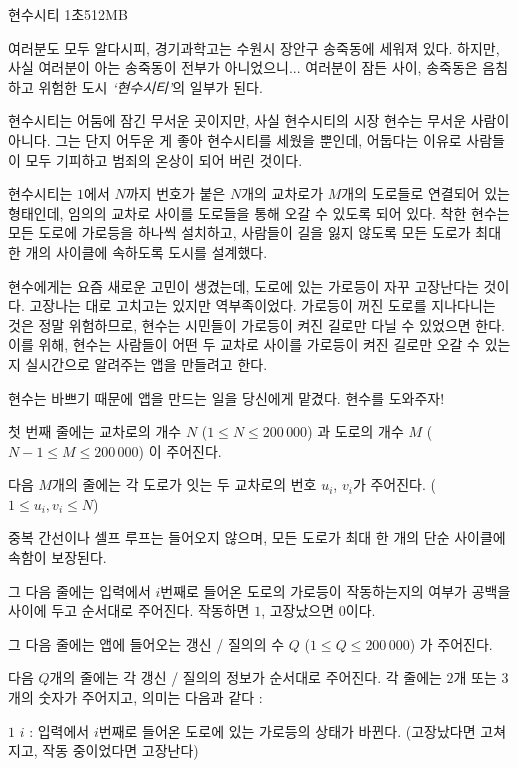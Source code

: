 \begin{problem}{현수시티}
{}{}
{1초}{512MB}{}

여러분도 모두 알다시피, 경기과학고는 수원시 장안구 송죽동에 세워져 있다. 하지만, 사실 여러분이 아는 송죽동이 전부가 아니었으니... 여러분이 잠든 사이, 송죽동은 음침하고 위험한 도시 \textit{`현수시티'}의 일부가 된다.

현수시티는 어둠에 잠긴 무서운 곳이지만, 사실 현수시티의 시장 현수는 무서운 사람이 아니다. 그는 단지 어두운 게 좋아 현수시티를 세웠을 뿐인데, 어둡다는 이유로 사람들이 모두 기피하고 범죄의 온상이 되어 버린 것이다.

현수시티는 $1$에서 $N$까지 번호가 붙은 $N$개의 교차로가 $M$개의 도로들로 연결되어 있는 형태인데, 임의의 교차로 사이를 도로들을 통해 오갈 수 있도록 되어 있다. 착한 현수는 모든 도로에 가로등을 하나씩 설치하고, 사람들이 길을 잃지 않도록 모든 도로가 최대 한 개의 사이클에 속하도록 도시를 설계했다.

현수에게는 요즘 새로운 고민이 생겼는데, 도로에 있는 가로등이 자꾸 고장난다는 것이다. 고장나는 대로 고치고는 있지만 역부족이었다. 가로등이 꺼진 도로를 지나다니는 것은 정말 위험하므로, 현수는 시민들이 가로등이 켜진 길로만 다닐 수 있었으면 한다. 이를 위해, 현수는 사람들이 어떤 두 교차로 사이를 가로등이 켜진 길로만 오갈 수 있는지 실시간으로 알려주는 앱을 만들려고 한다.

현수는 바쁘기 때문에 앱을 만드는 일을 당신에게 맡겼다. 현수를 도와주자!

\InputFile

첫 번째 줄에는 교차로의 개수 $N$ ($1 \le N \le 200\, 000$) 과 도로의 개수 $M$ ($N-1 \le M \le 200\, 000$) 이 주어진다.

다음 $M$개의 줄에는 각 도로가 잇는 두 교차로의 번호 $u_i$, $v_i$가 주어진다. ($1 \le u_i, v_i \le N$)

중복 간선이나 셀프 루프는 들어오지 않으며, 모든 도로가 최대 한 개의 단순 사이클에 속함이 보장된다.

그 다음 줄에는 입력에서 $i$번째로 들어온 도로의 가로등이 작동하는지의 여부가 공백을 사이에 두고 순서대로 주어진다. 작동하면 $1$, 고장났으면 $0$이다.

그 다음 줄에는 앱에 들어오는 갱신 / 질의의 수 $Q$ ($1 \le Q \le 200\, 000$) 가 주어진다.

다음 $Q$개의 줄에는 각 갱신 / 질의의 정보가 순서대로 주어진다. 각 줄에는 $2$개 또는 $3$개의 숫자가 주어지고, 의미는 다음과 같다 :

$1$ $i$ : 입력에서 $i$번째로 들어온 도로에 있는 가로등의 상태가 바뀐다. (고장났다면 고쳐지고, 작동 중이었다면 고장난다)


\end{problem}
